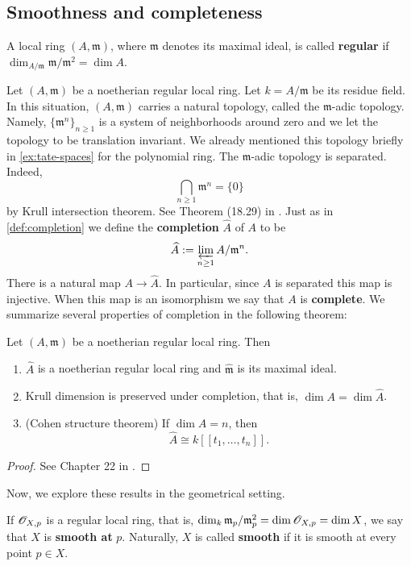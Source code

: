 \subsection*{Smoothness and completeness}
\begin{definition}\label{def:regular-local-ring}
	A local ring $(A, \mathfrak{m})$, where $\mathfrak{m}$ denotes its maximal ideal, is called \textbf{regular} if $\dim_{A/\mathfrak{m}} \mathfrak{m}/\mathfrak{m}^{2} = \dim A$. 
\end{definition}
Let $(A,\mathfrak{m})$ be a noetherian regular local ring. Let $k = A/\mathfrak{m}$ be its residue field. In this situation, $(A,\mathfrak{m})$ carries a natural topology, called the $\mathfrak{m}$-adic topology. Namely, $\{\mathfrak{m}^{n}\}_{n\geq 1}$ is a system of neighborhoods around zero and we let the topology to be translation invariant. We already mentioned this topology briefly in \cref{ex:tate-spaces} for the polynomial ring. The $\mathfrak{m}$-adic topology is separated. Indeed, 
\[
	\bigcap_{n\geq 1} \mathfrak{m}^{n} = \{0\}
\]
by Krull intersection theorem. See Theorem (18.29) in \cite{comm-alg}. Just as in \cref{def:completion} we define the \textbf{completion} $\widehat{A}$ of $A$ to be 
\[
	\widehat{A} := \varprojlim_{n\geq 1} A/\mathfrak{m}^{n}.
\]
There is a natural map $A \to \widehat{A}$. In particular, since $A$ is separated this map is injective. When this map is an isomorphism we say that $A$ is \textbf{complete}. We summarize several properties of completion in the following theorem:
\begin{theorem}\label{thm:properties-adic-completion}
	Let $(A,\mathfrak{m})$ be a noetherian regular local ring. Then
	\begin{enumerate}[label = (\alph*)]
		\item $\widehat{A}$ is a noetherian regular local ring and $\widehat{\mathfrak{m}}$ is its maximal ideal.
		\item Krull dimension is preserved under completion, that is, $\dim A = \dim \widehat{A}$.
		\item (Cohen structure theorem) If $\dim A = n$, then
		\[
			\widehat{A} \cong k\left[[t_{1}, \ldots, t_{n}]\right].
		\]
	\end{enumerate}
	\begin{proof}
	See Chapter 22 in \cite{comm-alg}.
	\end{proof}
	
\end{theorem}
Now, we explore these results in the geometrical setting. 
\begin{definition}\label{def:}
	If ${\mathscr O}_{X,p}$ is a regular local ring, that is, $\dim_{k} \mathfrak{m}_{p}/\mathfrak{m}_{p}^{2} = \dim {\mathscr O}_{X,p} = \dim X$, we say that $X$ is \textbf{smooth at} $p$. Naturally, $X$ is called \textbf{smooth} if it is smooth at every point $p\in X$.
\end{definition}
